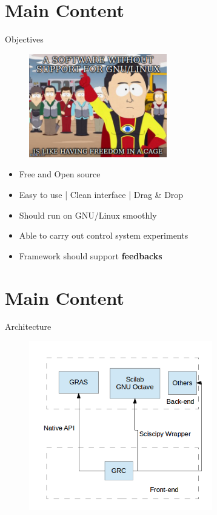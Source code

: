 \documentclass{beamer}
\begin{document}
\section{Main Content}

\begin{frame}{Objectives}

\begin{figure} [ht!]
	\centering
	\includegraphics[width=60mm]{meme2.jpg}
\end{figure}

\begin{itemize}
  \item Free and Open source
  \item Easy to use | Clean interface | Drag \& Drop 
  \item Should run on GNU/Linux smoothly
  \item Able to carry out control system experiments
  \item Framework should support \textbf{feedbacks}
\end{itemize}

\vskip 1cm

\end{frame}



\section{Main Content}

\begin{frame}{Architecture}

\begin{figure} [ht!]
	\centering
	\includegraphics[width=80mm]{image.png}
\end{figure}
\vskip 1cm
\end{frame}
\end{document}
